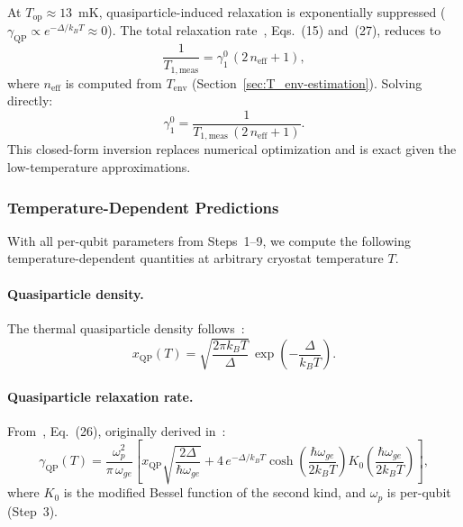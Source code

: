 \documentclass[showpacs,amsmath,amssymb,twocolumn,superscriptaddress,notitlepage,preprintnumbers,pra]{revtex4-1}
\begin{document}
At $T_\mathrm{op} \approx 13$~mK, quasiparticle-induced relaxation is exponentially suppressed ($\gamma_\mathrm{QP} \propto e^{-\Delta/k_B T} \approx 0$). The total relaxation rate~\cite{lvov2025thermometry}, Eqs.~(15) and~(27), reduces to
\begin{equation}
	\frac{1}{T_{1,\mathrm{meas}}} = \gamma_1^0\,(2\,n_\mathrm{eff} + 1),
\end{equation}
where $n_\mathrm{eff}$ is computed from $T_\mathrm{env}$ (Section~\ref{sec:T_env-estimation}). Solving directly:
\begin{equation}
	\label{eq:gamma0}
	\gamma_1^0 = \frac{1}{T_{1,\mathrm{meas}}\,(2\,n_\mathrm{eff} + 1)}.
\end{equation}
This closed-form inversion replaces numerical optimization and is exact given the low-temperature approximations.

\subsubsection{Temperature-Dependent Predictions}
\label{sec:temperature-extrapolation}

With all per-qubit parameters from Steps~1--9, we compute the following temperature-dependent quantities at arbitrary cryostat temperature $T$.

\paragraph{Quasiparticle density.}
The thermal quasiparticle density follows~\cite{lvov2025thermometry}:
\begin{equation}
	\label{eq:xqp}
	x_\mathrm{QP}(T) = \sqrt{\frac{2\pi k_B T}{\Delta}}\,\exp\!\left(-\frac{\Delta}{k_B T}\right).
\end{equation}

\paragraph{Quasiparticle relaxation rate.}
From~\cite{lvov2025thermometry}, Eq.~(26), originally derived in~\cite{catelani2011qp_relaxation}:
\begin{equation}
	\label{eq:gamma_qp}
	\gamma_\mathrm{QP}(T) = \frac{\omega_p^2}{\pi\,\omega_{ge}} \left[ x_\mathrm{QP}\sqrt{\frac{2\Delta}{\hbar\omega_{ge}}} + 4\,e^{-\Delta/k_B T}\cosh\!\left(\frac{\hbar\omega_{ge}}{2k_B T}\right) K_0\!\left(\frac{\hbar\omega_{ge}}{2k_B T}\right) \right],
\end{equation}
where $K_0$ is the modified Bessel function of the second kind, and $\omega_p$ is per-qubit (Step~3).
\end{document}
